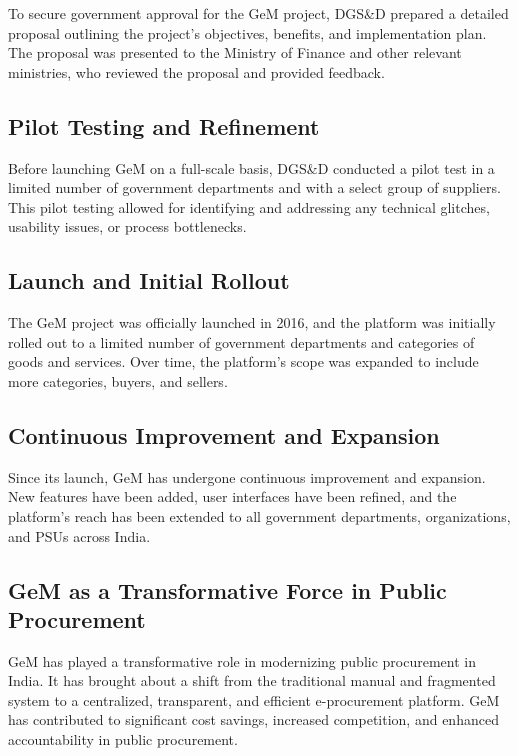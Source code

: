 To secure government approval for the GeM project, DGS\&D prepared a detailed proposal outlining the project's objectives, benefits, and implementation plan. The proposal was presented to the Ministry of Finance and other relevant ministries, who reviewed the proposal and provided feedback.

\subsection{Pilot Testing and Refinement}

Before launching GeM on a full-scale basis, DGS\&D conducted a pilot test in a limited number of government departments and with a select group of suppliers. This pilot testing allowed for identifying and addressing any technical glitches, usability issues, or process bottlenecks.

\subsection{Launch and Initial Rollout}

The GeM project was officially launched in 2016, and the platform was initially rolled out to a limited number of government departments and categories of goods and services. Over time, the platform's scope was expanded to include more categories, buyers, and sellers.

\subsection{Continuous Improvement and Expansion}

Since its launch, GeM has undergone continuous improvement and expansion. New features have been added, user interfaces have been refined, and the platform's reach has been extended to all government departments, organizations, and PSUs across India.

\subsection{GeM as a Transformative Force in Public Procurement}

GeM has played a transformative role in modernizing public procurement in India. It has brought about a shift from the traditional manual and fragmented system to a centralized, transparent, and efficient e-procurement platform. GeM has contributed to significant cost savings, increased competition, and enhanced accountability in public procurement.

